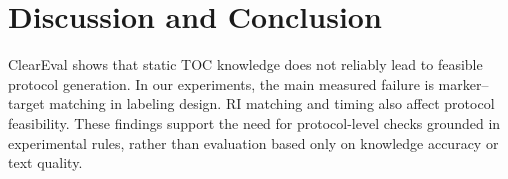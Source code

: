 \documentclass[conference]{IEEEtran}
\begin{document}
\begin{table}[t]
\centering
\setlength{\tabcolsep}{3pt}
\caption{Inference-time grounding on three models over 253 Application
scenarios. Com/Cor/Eff/$I_A$ are percentages. Effectiveness sub-scores are
normalized means in $[0,1]$. \textbf{Bold}${=}$best value per column within each
model. }
\label{tab:inference_time}
\end{table}

\section{Discussion and Conclusion}\label{sec:discussion}

ClearEval shows that static TOC knowledge does not reliably lead to feasible
protocol generation. In our experiments, the main measured failure is
marker--target matching in labeling design. RI matching and timing also affect
protocol feasibility. These findings support the need for protocol-level checks grounded in experimental rules, rather than evaluation based only on knowledge accuracy or text quality.
\end{document}
